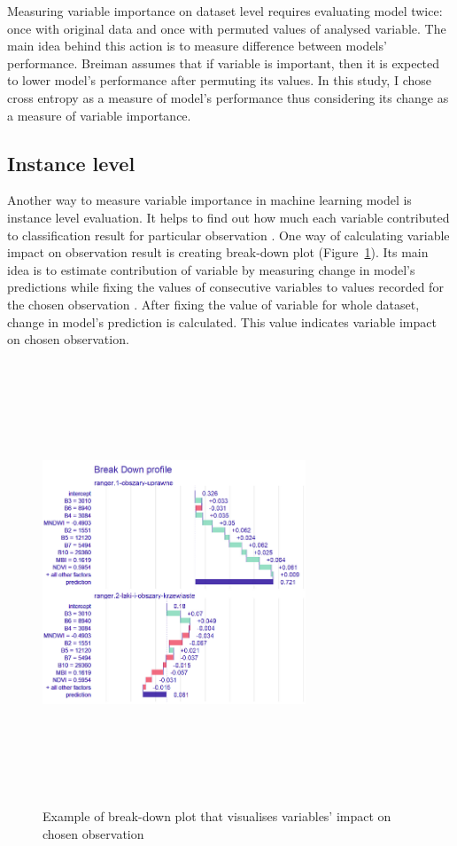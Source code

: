\documentclass{amuthesis}
\begin{document}
Measuring variable importance on dataset level requires evaluating model
twice: once with original data and once with permuted values of analysed
variable. The main idea behind this action is to measure difference
between models' performance. Breiman \autocite*{breiman_random_2001}
assumes that if variable is important, then it is expected to lower
model's performance after permuting its values. In this study, I chose
cross entropy as a measure of model's performance thus considering its
change as a measure of variable importance.

\hypertarget{sec-importance-instance}{%
\subsection{Instance level}\label{sec-importance-instance}}

Another way to measure variable importance in machine learning model is
instance level evaluation. It helps to find out how much each variable
contributed to classification result for particular observation
\autocite{biecek_explanatory_2021}. One way of calculating variable
impact on observation result is creating break-down plot
(Figure~\ref{fig-rycina5}). Its main idea is to estimate contribution of
variable by measuring change in model's predictions while fixing the
values of consecutive variables to values recorded for the chosen
observation \autocite{biecek_explanatory_2021}. After fixing the value
of variable for whole dataset, change in model's prediction is
calculated. This value indicates variable impact on chosen observation.

\begin{figure}[t]

{\centering \includegraphics[width=0.7\textwidth,height=5.20833in]{./figures/break-down_plot.png}

}

\caption{\label{fig-rycina5}Example of break-down plot that visualises
variables' impact on chosen observation}

\end{figure}
\end{document}

